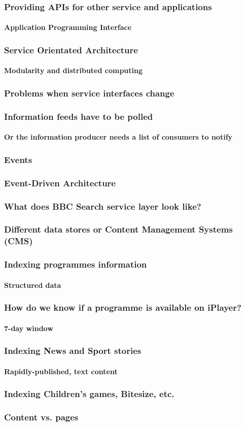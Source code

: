 \documentclass{beamer}
\begin{document}
\begin{frame}
  \frametitle{Providing APIs for other service and applications}
  \framesubtitle{Application Programming Interface}
\end{frame}

\begin{frame}
  \frametitle{Service Orientated Architecture}
  \framesubtitle{Modularity and distributed computing}
\end{frame}

\begin{frame}
  \frametitle{Problems when service interfaces change}
\end{frame}

\begin{frame}
  \frametitle{Information feeds have to be polled}
  \framesubtitle{Or the information producer needs a list of consumers to notify}
\end{frame}

\begin{frame}
  \frametitle{Events}
\end{frame}

\begin{frame}
  \frametitle{Event-Driven Architecture}
\end{frame}

\begin{frame}
  \frametitle{What does BBC Search service layer look like?}
\end{frame}

\begin{frame}
  \frametitle{Different data stores or Content Management Systems (CMS)}
\end{frame}

\begin{frame}
  \frametitle{Indexing programmes information}
  \framesubtitle{Structured data}
\end{frame}

\begin{frame}
  \frametitle{How do we know if a programme is available on iPlayer?}
  \framesubtitle{7-day window}
\end{frame}

\begin{frame}
  \frametitle{Indexing News and Sport stories}
  \framesubtitle{Rapidly-published, text content}
\end{frame}

\begin{frame}
  \frametitle{Indexing Children's games, Bitesize, etc.}
  \frametitle{Content vs. pages}
\end{frame}
\end{document}
